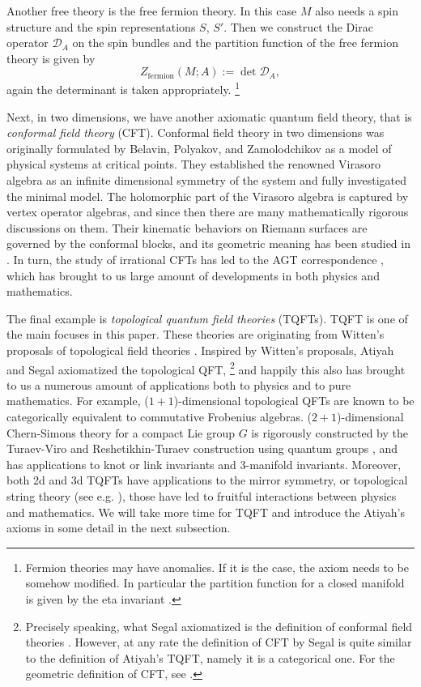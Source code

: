 Another free theory is the free fermion theory. In this case $M$
also needs a spin structure and the spin representations $S$, $S'$.
Then we construct the Dirac operator $\mathcal{D}_{A}$ on the spin
bundles and the partition function of the free fermion theory is given
by
\begin{equation}
Z_{\mathrm{fermion}}\left(M;A\right):=\det\mathcal{D}_{A},
\end{equation}
 again the determinant is taken appropriately.%
%
\footnote{Fermion theories may have anomalies. If it is the case, the axiom
needs to be somehow modified. In particular the partition function
for a closed manifold is given by the eta invariant \cite{Dai:1994kq}. }

Next, in two dimensions, we have another axiomatic quantum field theory,
that is \emph{conformal field theory} (CFT). Conformal field theory
in two dimensions was originally formulated by Belavin, Polyakov,
and Zamolodchikov \cite{Belavin:1984vu} as a model of physical systems at critical
points. They established the renowned Virasoro algebra as an infinite
dimensional symmetry of the system and fully investigated the minimal
model. The holomorphic part of the Virasoro algebra is captured by
vertex operator algebras, and since then there are many mathematically
rigorous discussions on them. Their kinematic behaviors on Riemann
surfaces are governed by the conformal blocks, and its geometric meaning
has been studied in \cite{Friedan:1986ua}. In turn, the study of irrational
CFTs has led to the AGT correspondence \cite{Alday:2009aq}, which has brought
to us large amount of developments in both physics and mathematics.

The final example is \emph{topological quantum field theories} (TQFTs).
TQFT is one of the main focuses in this paper. These theories are
originating from Witten's proposals of topological field theories
\cite{Witten:1988xj, Witten:1988ze, Witten:1988hf}. Inspired by Witten's
proposals, Atiyah and Segal axiomatized the topological QFT,%
%
\footnote{Precisely speaking, what Segal axiomatized is the definition of conformal
field theories \cite{Segal:2002ei}. However, at any rate the definition of CFT by Segal
is quite similar to the definition of Atiyah's TQFT, namely it is a
categorical one. For the geometric definition of CFT, see \cite{Friedan:1986ua}. }
%
 and happily this also has brought to us a numerous amount of applications
both to physics and to pure mathematics. For example, ($1+1$)-dimensional
topological QFTs are known to be categorically equivalent to commutative
Frobenius algebras. ($2+1$)-dimensional Chern-Simons theory for a
compact Lie group $G$ is rigorously constructed by the Turaev-Viro
and Reshetikhin-Turaev construction using quantum groups \cite{Turaev:1992hq, Reshetikhin:1991tc}, and has
applications to knot or link invariants and $3$-manifold invariants.
Moreover, both 2d and 3d TQFTs have applications to the mirror symmetry,
or topological string theory (see e.g. \cite{Hori:2003ic}), those have led to fruitful interactions
between physics and mathematics. We will take more time for TQFT and
introduce the Atiyah's axioms in some detail in the next subsection.

